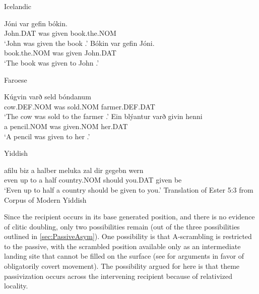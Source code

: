 \begin{exe}
\ex Icelandic
\begin{xlist}
\ex \gll J\'{o}ni var gefin b\'{o}kin.\\
John.DAT was given book.the.NOM\\
\trans `John was given the book \citep{Holmberg.1995,Bardal.2001}.'
\ex \gll B\'{o}kin var gefin J\'{o}ni.\\
book.the.NOM was given John.DAT\\
\trans `The book was given to John \citep{Holmberg.1995,Bardal.2001}.'
\end{xlist}
\ex Faroese 
\begin{xlist}
\ex \gll Kúgvin varð seld bóndanum\\
cow.DEF.NOM was sold.NOM farmer.DEF.DAT\\
\trans `The cow was sold to the farmer \citep[ex. 103]{Barnes.1986}.'
\ex \gll Ein blýantur varð givin henni\\
a pencil.NOM was given.NOM her.DAT\\
\trans `A pencil was given to her \citep[ex. 104]{Barnes.1986}.' 
\end{xlist}
\ex Yiddish
\begin{xlist}
\ex \gll afilu biz a halber meluka zal dir gegebn wern\\
even {up to} a half country.NOM should you.DAT given be\\
\trans `Even up to half a country should be given to you.' Translation of Ester 5:3 from Corpus of Modern Yiddish \citep{Bezrukov.2014}
\end{xlist}
\end{exe}

Since the recipient occurs in its base generated position, and there is no evidence of clitic doubling, only two possibilities remain (out of the three possibilities outlined in \autoref{sec:PassiveAsym}). One possibility is that A-scrambling is restricted to the passive, with the scrambled position available only as an intermediate landing site that cannot be filled on the surface (see \cite[119ff]{Richards.2001} for arguments in favor of obligatorily covert movement). The possibility argued for here is that theme passivization occurs across the intervening recipient because of relativized locality.

